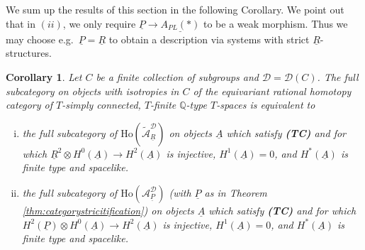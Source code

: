 \documentclass[12pt,a4paper]{article}
\newtheorem{cor}[thm]{Corollary}
\theoremstyle{definition}
\begin{document}
We sum up the results of this section in the following Corollary. We point out that in $(ii)$,  we only require $\underline{P}\rightarrow \underline{A_{PL}(*)}$ to be a weak morphism. Thus we may choose e.g.\ $\underline{P}=\underline{R}$ to obtain a description via systems with strict $\underline{R}$-structures. 

\begin{cor}\label{cor:categorialdescription}
Let $C$ be a finite collection of subgroups and $\mathcal{D}=\mathcal{D}(C)$. The full subcategory on objects with isotropies in $C$ of the equivariant rational homotopy category of $T$-simply connected, $T$-finite $\mathbb{Q}$-type $T$-spaces is equivalent to
\begin{enumerate}[(i)]
\item the full subcategory of $\mathrm{Ho}(\widetilde{\mathcal{A}}^\mathcal{D}_{\underline{R}})$ on objects $\underline{A}$ which satisfy \textbf{(TC)} and for which $\underline{R}^2\otimes H^0(\underline{A})\rightarrow H^2(\underline{A})$ is injective, $H^1(\underline{A})=0$, and $H^*(\underline{A})$ is finite type and spacelike.
\item the full subcategory of $\mathrm{Ho}(\mathcal{A}^\mathcal{D}_{\underline{P}})$ (with $\underline{P}$ as in Theorem \ref{thm:categorystricitification}) on objects $\underline{A}$ which satisfy \textbf{(TC)} and for which $H^2(\underline{P})\otimes H^0(\underline{A})\rightarrow H^2(\underline{A})$ is injective, $H^1(\underline{A})=0$, and $H^*(\underline{A})$ is finite type and spacelike.
\end{enumerate}
\end{cor}
\end{document}
